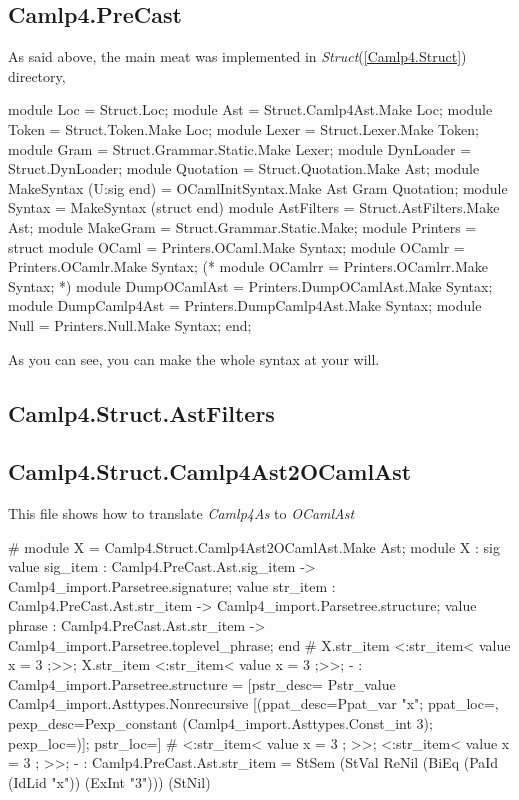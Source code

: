 \subsection{Camlp4.PreCast}

As said above, the main meat was implemented in
\textit{Struct}(\ref{Camlp4.Struct}) directory,

\begin{ocamlcode}
  module Loc = Struct.Loc;
  module Ast = Struct.Camlp4Ast.Make Loc;
  module Token = Struct.Token.Make Loc;
  module Lexer = Struct.Lexer.Make Token;
  module Gram = Struct.Grammar.Static.Make Lexer;
  module DynLoader = Struct.DynLoader;
  module Quotation = Struct.Quotation.Make Ast;
  module MakeSyntax (U:sig end) =
    OCamlInitSyntax.Make Ast Gram Quotation;
  module Syntax = MakeSyntax (struct end)
  module AstFilters = Struct.AstFilters.Make Ast;
  module MakeGram = Struct.Grammar.Static.Make;
  module Printers = struct
    module OCaml = Printers.OCaml.Make Syntax;
    module OCamlr = Printers.OCamlr.Make Syntax;
    (* module OCamlrr = Printers.OCamlrr.Make Syntax; *)
    module DumpOCamlAst = Printers.DumpOCamlAst.Make Syntax;
    module DumpCamlp4Ast = Printers.DumpCamlp4Ast.Make Syntax;
    module Null = Printers.Null.Make Syntax;
  end;
\end{ocamlcode}

As you can see, you can make the whole syntax at your will.

\subsection{Camlp4.Struct.AstFilters}
\label{Camlp4.Struct.AstFilters}


\subsection{Camlp4.Struct.Camlp4Ast2OCamlAst}
\label{Camlp4.Struct.Camlp4Ast2OCamlAst}

This file shows how to translate \textit{Camlp4As} to
\textit{OCamlAst}


\begin{ocamlcode}
# module X = Camlp4.Struct.Camlp4Ast2OCamlAst.Make Ast;  
module X :
  sig
    value sig_item :
      Camlp4.PreCast.Ast.sig_item ->
      Camlp4_import.Parsetree.signature;
    value str_item :
      Camlp4.PreCast.Ast.str_item ->
      Camlp4_import.Parsetree.structure;
    value phrase :
      Camlp4.PreCast.Ast.str_item ->
      Camlp4_import.Parsetree.toplevel_phrase;
   end
# X.str_item <:str_item< value x = 3 ;>>;
X.str_item <:str_item< value x = 3 ;>>;
- : Camlp4_import.Parsetree.structure =
[{pstr_desc=
   Pstr_value Camlp4_import.Asttypes.Nonrecursive
    [({ppat_desc=Ppat_var "x"; ppat_loc=},
     {pexp_desc=Pexp_constant (Camlp4_import.Asttypes.Const_int 3);
      pexp_loc=})];
  pstr_loc=}]
# <:str_item< value x = 3 ; >>;
<:str_item< value x = 3 ; >>;
- : Camlp4.PreCast.Ast.str_item =
StSem  (StVal  ReNil (BiEq  (PaId  (IdLid  "x")) (ExInt  "3"))) (StNil)
\end{ocamlcode}


